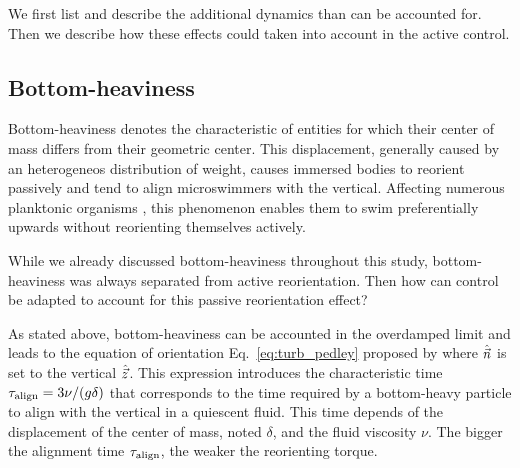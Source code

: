 We first list and describe the additional dynamics than can be accounted for.
Then we describe how these effects could taken into account in the active control.

\subsection{Bottom-heaviness}\label{sec:add_bh}

Bottom-heaviness denotes the characteristic of entities for which their center of mass differs from their geometric center.
This displacement, generally caused by an heterogeneos distribution of weight, causes immersed bodies to reorient passively and tend to align microswimmers with the vertical.
Affecting numerous planktonic organisms \citep{wheeler2019not, chan2012biomechanics, mogami2001theoretical}, this phenomenon enables them to swim preferentially upwards without reorienting themselves actively.

While we already discussed bottom-heaviness throughout this study, bottom-heaviness was always separated from active reorientation.
Then how can control be adapted to account for this passive reorientation effect?

As stated above, bottom-heaviness can be accounted in the overdamped limit and leads to the equation of orientation Eq.~\eqref{eq:turb_pedley} proposed by \citet{Pedley1992} where $\hat{\vec{n}}$ is set to the vertical $\hat{\vec{z}}$.
This expression introduces the characteristic time $\tau_{\mathrm{align}} = 3 \nu / (g \delta)$ that corresponds to the time required by a bottom-heavy particle to align with the vertical in a quiescent fluid.
This time depends of the displacement of the center of mass, noted $\delta$, and the fluid viscosity $\nu$.
The bigger the alignment time $\tau_{\mathrm{align}}$, the weaker the reorienting torque.

